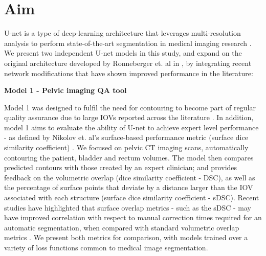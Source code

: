 \section{Aim}

U-net is a type of deep-learning architecture that leverages multi-resolution analysis to perform state-of-the-art segmentation in medical imaging research \cite{Kazemifar_2018, Zhu_2018}. We present two independent U-net models in this study, and expand on the original architecture developed by Ronneberger et. al in \cite{Ronneberger_2015}, by integrating recent network  modifications that have shown improved performance in the literature: 

\textbf{Model 1 - Pelvic imaging QA tool}

Model 1 was designed to fulfil the need for contouring to become part of regular quality assurance due to large IOVs reported across the literature \cite{Vinod_2016}. In addition, model 1 aims to evaluate the ability of U-net to achieve expert level performance - as defined by Nikolov et. al's surface-based performance metric (surface dice similarity coefficient) \cite{Nikolov_2018}. We focused on pelvic CT imaging scans, automatically contouring the patient, bladder and rectum volumes. The model then compares predicted contours with those created by an expert clinician; and provides feedback on the volumetric overlap (dice similarity coefficient - DSC), as well as the percentage of surface points that deviate by a distance larger than the IOV associated with each structure (surface dice similarity coefficient - sDSC). Recent studies have highlighted that surface overlap metrics - such as the sDSC - may have improved correlation with respect to manual correction times required for an automatic segmentation, when compared with standard volumetric overlap metrics \cite{Vaassen_2020}. We present both metrics for comparison, with models trained over a variety of loss functions common to medical image segmentation.

